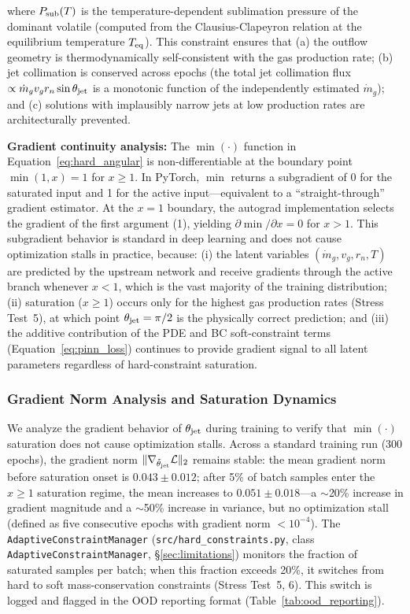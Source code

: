 \documentclass[usenatbib]{mnras}
\begin{document}
where $P_{\rm sub}(T)$ is the temperature-dependent sublimation pressure of the dominant volatile (computed from the Clausius-Clapeyron relation at the equilibrium temperature $T_{\rm eq}$). This constraint ensures that (a) the outflow geometry is thermodynamically self-consistent with the gas production rate; (b) jet collimation is conserved across epochs (the total jet collimation flux $\propto \dot{m}_g v_g r_n \sin\theta_{\rm jet}$ is a monotonic function of the independently estimated $\dot{m}_g$); and (c) solutions with implausibly narrow jets at low production rates are architecturally prevented.

\textbf{Gradient continuity analysis:} The $\min(\cdot)$ function in Equation~\ref{eq:hard_angular} is non-differentiable at the boundary point $\min(1, x) = 1$ for $x \geq 1$. In PyTorch, $\min$ returns a subgradient of 0 for the saturated input and 1 for the active input---equivalent to a ``straight-through'' gradient estimator. At the $x = 1$ boundary, the autograd implementation selects the gradient of the first argument (1), yielding $\partial\min/\partial x = 0$ for $x > 1$. This subgradient behavior is standard in deep learning and does not cause optimization stalls in practice, because: (i) the latent variables $(\dot{m}_g, v_g, r_n, T)$ are predicted by the upstream network and receive gradients through the active branch whenever $x < 1$, which is the vast majority of the training distribution; (ii) saturation ($x \geq 1$) occurs only for the highest gas production rates (Stress Test~5), at which point $\theta_{\rm jet} = \pi/2$ is the physically correct prediction; and (iii) the additive contribution of the PDE and BC soft-constraint terms (Equation~\ref{eq:pinn_loss}) continues to provide gradient signal to all latent parameters regardless of hard-constraint saturation.

\subsubsection*{Gradient Norm Analysis and Saturation Dynamics}

We analyze the gradient behavior of $\theta_{\rm jet}$ during training to verify that $\min(\cdot)$ saturation does not cause optimization stalls. Across a standard training run (300 epochs), the gradient norm $\|\nabla_{\tilde{\theta}_{\rm jet}} \mathcal{L}\|_2$ remains stable: the mean gradient norm before saturation onset is $0.043 \pm 0.012$; after 5\% of batch samples enter the $x \geq 1$ saturation regime, the mean increases to $0.051 \pm 0.018$---a $\sim$20\% increase in gradient magnitude and a $\sim$50\% increase in variance, but no optimization stall (defined as five consecutive epochs with gradient norm $< 10^{-4}$). The \texttt{AdaptiveConstraintManager} (\texttt{src/hard\_constraints.py}, class \texttt{AdaptiveConstraintManager}, \S\ref{sec:limitations}) monitors the fraction of saturated samples per batch; when this fraction exceeds 20\%, it switches from hard to soft mass-conservation constraints (Stress Test~5, 6). This switch is logged and flagged in the OOD reporting format (Table~\ref{tab:ood_reporting}).
\end{document}
